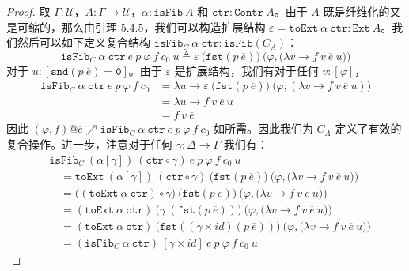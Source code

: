 \documentclass{ctexrep}
\theoremstyle{plain}
\theoremstyle{definition}
\theoremstyle{remark}
\begin{document}
\begin{proof}
取 $\Gamma : \mathcal{U}$，$A : \Gamma \to \mathcal{U}$，$\alpha : \mathtt{isFib}\ A$ 和 $\mathtt{ctr} : \mathtt{Contr}\ A$。由于 $A$ 既是纤维化的又是可缩的，那么由引理 5.4.5，我们可以构造扩展结构 $\varepsilon = \mathtt{toExt}\ \alpha\ \mathtt{ctr} : \mathtt{Ext}\ A$。我们然后可以如下定义复合结构 $\mathtt{isFib}_C\ \alpha\ \mathtt{ctr} : \mathtt{isFib}(C_A)$：
$$\mathtt{isFib}_C\ \alpha\ \mathtt{ctr}\ e\ p\ \varphi\ f\ c_0\ u \triangleq \varepsilon\ \big(\mathtt{fst}(p\ \overline{e})\big)\ \big(\varphi, \big(\lambda v \to f\ v\ \overline{e}\ u\big)\big)$$
对于 $u : [\mathtt{snd}(p\ \overline{e}) = \mathtt{0}]$。由于 $\varepsilon$ 是扩展结构，我们有对于任何 $v : [\varphi]$，
\begin{align*}
\mathtt{isFib}_C\ \alpha\ \mathtt{ctr}\ e\ p\ \varphi\ f\ c_0 &= \lambda u \to \varepsilon\ \big(\mathtt{fst}(p\ \overline{e})\big)\ \big(\varphi, (\lambda v \to f\ v\ \overline{e}\ u)\big) \\
&= \lambda u \to f\ v\ \overline{e}\ u \\
&= f\ v\ \overline{e}
\end{align*}
因此 $(\varphi, f) @ \overline{e} \nearrow \mathtt{isFib}_C\ \alpha\ \mathtt{ctr}\ e\ p\ \varphi\ f\ c_0$ 如所需。因此我们为 $C_A$ 定义了有效的复合操作。进一步，注意对于任何 $\gamma : \Delta \to \Gamma$ 我们有：
\begin{align*}
&\mathtt{isFib}_C\ (\alpha[\gamma])\ (\mathtt{ctr} \circ \gamma)\ e\ p\ \varphi\ f\ c_0\ u \\
&\quad = \mathtt{toExt}\ (\alpha[\gamma])\ (\mathtt{ctr} \circ \gamma)\ \big(\mathtt{fst}(p\ \overline{e})\big)\ \big(\varphi, \big(\lambda v \to f\ v\ \overline{e}\ u\big)\big) \\
&\quad = \big((\mathtt{toExt}\ \alpha\ \mathtt{ctr}) \circ \gamma\big)\ \big(\mathtt{fst}(p\ \overline{e})\big)\ \big(\varphi, \big(\lambda v \to f\ v\ \overline{e}\ u\big)\big) \\
&\quad = (\mathtt{toExt}\ \alpha\ \mathtt{ctr})\ \big(\gamma\ (\mathtt{fst}(p\ \overline{e}))\big)\ \big(\varphi, \big(\lambda v \to f\ v\ \overline{e}\ u\big)\big) \\
&\quad = (\mathtt{toExt}\ \alpha\ \mathtt{ctr})\ \big(\mathtt{fst}((\gamma \times  id )(p\ \overline{e}))\big)\ \big(\varphi, \big(\lambda v \to f\ v\ \overline{e}\ u\big)\big) \\
&\quad = (\mathtt{isFib}_C\ \alpha\ \mathtt{ctr})\ [\gamma \times  id ]\ e\ p\ \varphi\ f\ c_0\ u
\end{align*}
\end{proof}
\end{document}
